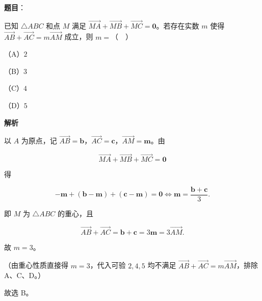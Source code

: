 \begin{answer}

\textbf{题目}：

已知 $\triangle ABC$ 和点 $M$ 满足 $\overrightarrow{MA}+\overrightarrow{MB}+\overrightarrow{MC}=\boldsymbol 0$。若存在实数 $m$ 使得 $\overrightarrow{AB}+\overrightarrow{AC}=m\overrightarrow{AM}$ 成立，则 $m=$（　）

（A）$2$

（B）$3$

（C）$4$

（D）$5$

\textbf{解析}

以 $A$ 为原点，记 $\overrightarrow{AB}=\boldsymbol b$，$\overrightarrow{AC}=\boldsymbol c$，$\overrightarrow{AM}=\boldsymbol m$。由

\nopagebreak[4]
\[\overrightarrow{MA}+\overrightarrow{MB}+\overrightarrow{MC}=\boldsymbol 0\]

得

\nopagebreak[4]
\[-\boldsymbol m+(\boldsymbol b-\boldsymbol m)+(\boldsymbol c-\boldsymbol m)=\boldsymbol 0
\iff \boldsymbol m=\frac{\boldsymbol b+\boldsymbol c}{3}.\]

即 $M$ 为 $\triangle ABC$ 的重心，且

\nopagebreak[4]
\[\overrightarrow{AB}+\overrightarrow{AC}=\boldsymbol b+\boldsymbol c=3\boldsymbol m=3\overrightarrow{AM}.\]

故 $m=3$。

（由重心性质直接得 $m=3$，代入可验 $2,4,5$ 均不满足 $\overrightarrow{AB}+\overrightarrow{AC}=m\overrightarrow{AM}$，排除 A、C、D。）

故选 B。


\end{answer}
